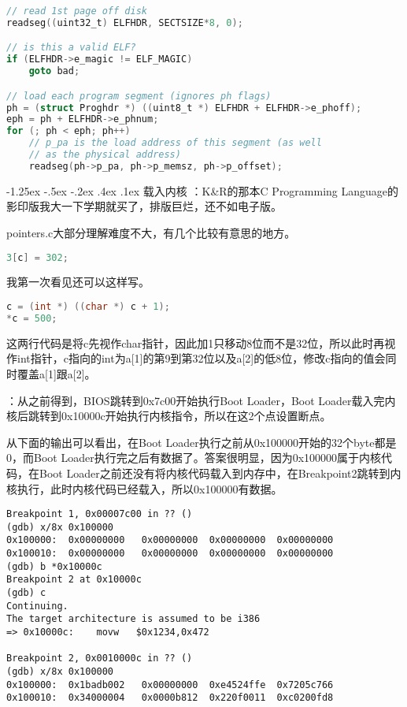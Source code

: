 \documentclass[a4paper, 11pt]{ctexart}
\makeatletter
\newcommand{\xiaosihao}{\fontsize{12pt}{\baselineskip}\selectfont}
\renewcommand\subsection{\@startsection{subsection}{1}{\z@}%
{-1.25ex \@plus -.5ex \@minus -.2ex}%
{.4ex \@plus .1ex}%
{\normalfont\xiaosihao\CJKfamily{hei}}}
\makeatother
\begin{document}
\begin{lstlisting}[language={C}] 
// read 1st page off disk
readseg((uint32_t) ELFHDR, SECTSIZE*8, 0);

// is this a valid ELF?
if (ELFHDR->e_magic != ELF_MAGIC)
	goto bad;

// load each program segment (ignores ph flags)
ph = (struct Proghdr *) ((uint8_t *) ELFHDR + ELFHDR->e_phoff);
eph = ph + ELFHDR->e_phnum;
for (; ph < eph; ph++)
	// p_pa is the load address of this segment (as well
	// as the physical address)
	readseg(ph->p_pa, ph->p_memsz, ph->p_offset);
\end{lstlisting}

\subsection{载入内核}
\color{red}{练习4}：\color{black}K\&R的那本C Programming Language的影印版我大一下学期就买了，排版巨烂，还不如电子版。

pointers.c大部分理解难度不大，有几个比较有意思的地方。
\begin{lstlisting}[language={C}]
3[c] = 302;
\end{lstlisting}

我第一次看见还可以这样写。
\begin{lstlisting}[language={C}]
c = (int *) ((char *) c + 1);
*c = 500;
\end{lstlisting}

这两行代码是将c先视作char指针，因此加1只移动8位而不是32位，所以此时再视作int指针，c指向的int为a[1]的第9到第32位以及a[2]的低8位，修改c指向的值会同时覆盖a[1]跟a[2]。

\color{red}{练习5}：\color{black}从之前得到，BIOS跳转到0x7c00开始执行Boot Loader，Boot Loader载入完内核后跳转到0x10000c开始执行内核指令，所以在这2个点设置断点。

从下面的输出可以看出，在Boot Loader执行之前从0x100000开始的32个byte都是0，而Boot Loader执行完之后有数据了。答案很明显，因为0x100000属于内核代码，在Boot Loader之前还没有将内核代码载入到内存中，在Breakpoint2跳转到内核执行，此时内核代码已经载入，所以0x100000有数据。

\begin{lstlisting}[numbers=none]
Breakpoint 1, 0x00007c00 in ?? ()
(gdb) x/8x 0x100000
0x100000:  0x00000000	0x00000000	0x00000000	0x00000000
0x100010:  0x00000000	0x00000000	0x00000000	0x00000000
(gdb) b *0x10000c
Breakpoint 2 at 0x10000c
(gdb) c
Continuing.
The target architecture is assumed to be i386
=> 0x10000c:	movw   $0x1234,0x472

Breakpoint 2, 0x0010000c in ?? ()
(gdb) x/8x 0x100000
0x100000:  0x1badb002	0x00000000	0xe4524ffe	0x7205c766
0x100010:  0x34000004	0x0000b812	0x220f0011	0xc0200fd8
\end{lstlisting}
\end{document}
